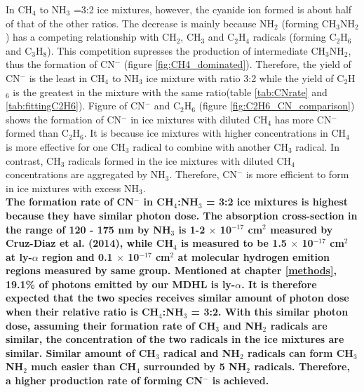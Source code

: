 In CH$_4$ to NH$_3$ =3:2 ice mixtures, however, the cyanide ion formed is about half of that of the other ratios. The decrease is mainly because NH$_2$ (forming CH$_3$NH$_2$) has a competing relationship with CH$_2$, CH$_3$ and C$_2$H$_4$ radicals (forming C$_2$H$_6$ and C$_3$H$_8$). This competition supresses the production of intermediate CH$_3$NH$_2$, thus the formation of CN$^-$ (figure \ref{fig:CH4_dominated}). Therefore, the yield of CN$^-$ is the least in CH$_4$ to NH$_3$ ice mixture with ratio 3:2 while the yield of C$_2$H$_6$ is the greatest in the mixture with the same ratio(table \ref{tab:CNrate} and \ref{tab:fittingC2H6}). Figure of CN$^-$ and C$_2$H$_6$ (figure \ref{fig:C2H6_CN_comparison}) shows the formation of CN$^-$ in ice mixtures with diluted CH$_4$ has more CN$^-$ formed than C$_2$H$_6$. It is because ice mixtures with higher concentrations in CH$_4$ is more effective for one CH$_3$ radical to combine with another CH$_3$ radical. In contrast, CH$_3$ radicals formed in the ice mixtures with diluted CH$_4$ concentrations are aggregated by NH$_3$. Therefore, CN$^-$ is more efficient to form in ice mixtures with excess NH$_3$.\\

\textbf{The formation rate of CN$^-$ in CH$_4$:NH$_3$ = 3:2 ice mixtures is highest because they have similar photon dose. The absorption cross-section in the range of 120 - 175 nm by NH$_3$ is 1-2 $\times$ 10$^{-17}$ cm$^2$  measured by Cruz-Diaz et al. (2014)\cite{cruz2014vacuum}, while CH$_4$ is measured to be 1.5 $\times$ 10$^{-17}$ cm$^2$ at ly-$\alpha$ region and 0.1 $\times$ 10$^{-17}$ cm$^2$ at molecular hydrogen emition regions measured by same group\cite{cruz2014nonpolar}. Mentioned at chapter \ref{methods}, 19.1\% of photons emitted by our MDHL is ly-$\alpha$. It is therefore expected that the two species receives similar amount of photon dose when their relative ratio is CH$_4$:NH$_3$ = 3:2. With this similar photon dose, assuming their formation rate of CH$_3$ and NH$_2$ radicals are similar, the concentration of the two radicals in the ice mixtures are similar. Similar amount of CH$_3$ radical and NH$_2$ radicals can form CH$_3$NH$_2$ much easier than CH$_4$ surrounded by 5 NH$_2$ radicals. Therefore, a higher production rate of forming CN$^-$ is achieved.}



